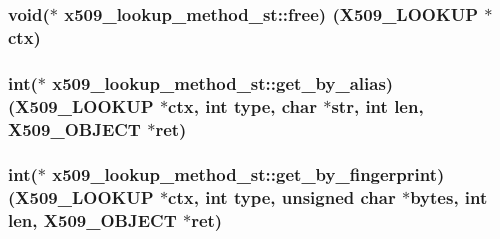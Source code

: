 \subsubsection[{\texorpdfstring{free}{free}}]{\setlength{\rightskip}{0pt plus 5cm}void($\ast$ x509\+\_\+lookup\+\_\+method\+\_\+st\+::free) ({\bf X509\+\_\+\+L\+O\+O\+K\+UP} $\ast$ctx)}\hypertarget{structx509__lookup__method__st_a0ef0e21d7fe023bc976d002e1dd5a810}{}\label{structx509__lookup__method__st_a0ef0e21d7fe023bc976d002e1dd5a810}
\subsubsection[{\texorpdfstring{get\+\_\+by\+\_\+alias}{get_by_alias}}]{\setlength{\rightskip}{0pt plus 5cm}int($\ast$ x509\+\_\+lookup\+\_\+method\+\_\+st\+::get\+\_\+by\+\_\+alias) ({\bf X509\+\_\+\+L\+O\+O\+K\+UP} $\ast$ctx, int {\bf type}, char $\ast$str, int {\bf len}, {\bf X509\+\_\+\+O\+B\+J\+E\+CT} $\ast$ret)}\hypertarget{structx509__lookup__method__st_a2db768d3cfbb0bfd076e5e8c17590d80}{}\label{structx509__lookup__method__st_a2db768d3cfbb0bfd076e5e8c17590d80}
\subsubsection[{\texorpdfstring{get\+\_\+by\+\_\+fingerprint}{get_by_fingerprint}}]{\setlength{\rightskip}{0pt plus 5cm}int($\ast$ x509\+\_\+lookup\+\_\+method\+\_\+st\+::get\+\_\+by\+\_\+fingerprint) ({\bf X509\+\_\+\+L\+O\+O\+K\+UP} $\ast$ctx, int {\bf type}, unsigned char $\ast${\bf bytes}, int {\bf len}, {\bf X509\+\_\+\+O\+B\+J\+E\+CT} $\ast$ret)}\hypertarget{structx509__lookup__method__st_ae5331725f3feb7f560e670cc529b4475}{}\label{structx509__lookup__method__st_ae5331725f3feb7f560e670cc529b4475}
